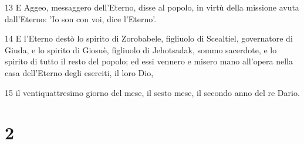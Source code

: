 \par 13 E Aggeo, messaggero dell'Eterno, disse al popolo, in virtù della missione avuta dall'Eterno: 'Io son con voi, dice l'Eterno'.
\par 14 E l'Eterno destò lo spirito di Zorobabele, figliuolo di Scealtiel, governatore di Giuda, e lo spirito di Giosuè, figliuolo di Jehotsadak, sommo sacerdote, e lo spirito di tutto il resto del popolo; ed essi vennero e misero mano all'opera nella casa dell'Eterno degli eserciti, il loro Dio,
\par 15 il ventiquattresimo giorno del mese, il sesto mese, il secondo anno del re Dario.

\chapter{2}

